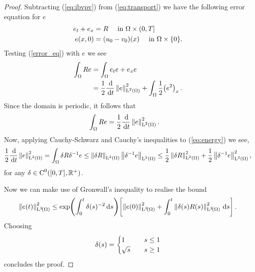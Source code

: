 \documentclass[final]{amsart}
\renewcommand{\d}{\ensuremath{\,\mathrm{d}}}
\numberwithin{equation}{section}
\begin{document}
\begin{proof}
  Subtracting (\ref{eq:ibvpv}) from (\ref{eq:transport}) we have the
  following error equation for $e$
  \begin{equation}\label{error_eq}
    \begin{aligned}
      e_t
      +
      e_x &=R \quad \text{ in }\Omega \times (0,T]
      \\
      e( x,0) &= (u_0 - v_0)( x) \quad \text{ in } \Omega \times \{0\}.
    \end{aligned}
  \end{equation}
  Testing (\ref{error_eq}) with $e$ we see
  \begin{equation}
    \begin{aligned}
      \int_\W Re &= \int_\W e_te+ e_x e
      \\
      &=
      \frac{1}{2}\dd t \Norm{e}_{\leb{2}(\W)}^2+\int_\W\frac{1}{2}  \qp{ e^2}_x.
    \end{aligned}
  \end{equation}
   Since the domain is periodic, it follows that
  \begin{equation}
    \label{eq:energy}
    \begin{aligned}    
      \int_\W Re
      &= 
      \frac{1}{2}\dd t \Norm{e}_{\leb{2}(\W)}^2.
    \end{aligned}
  \end{equation}
  Now, applying Cauchy-Schwarz and Cauchy's inequalities to
  (\ref{eq:energy}) we see,
  \begin{equation}
      \frac{1}{2}\dd t \Norm{e}_{\leb{2}(\W)}^2
      =
      \int_\W\delta R \delta^{-1} e
      \leq
      \Norm{\delta R}_{\leb{2}(\W)} \Norm{\delta^{-1} e}_{\leb{2}(\W)}
      \leq
      \frac{1}{2}\Norm{\delta R}_{\leb{2}(\W)}^2+ \frac{1}{2}\Norm{\delta^{-1} e}_{\leb{2}(\W)}^2,
  \end{equation}
  for any $\delta\in\operatorname C^{0}([0,T], \mathbb R^+)$.

  Now we can make use of Gronwall's inequality to realise the bound
  \begin{equation}
    \Norm{e\qp{t}}^2_{\leb{2}\qp{\W}}
    \leq
    \exp\qp{\int_{0}^{t}{\delta(s)^{-2}}\d s}
    \qb{\Norm{e\qp{0}}^2_{\leb{2}\qp{\W}}+\int_0^t\Norm{\delta(s) R(s)}^2_{\leb{2}\qp{\W}}  \d s }.
  \end{equation}
  Choosing 
  \begin{equation}
    \delta\!\left({s}\right)=
    \begin{cases}
      1 \quad &s\leq 1
      \\
      \sqrt{s}\quad &s\geq 1
    \end{cases}
  \end{equation}
  concludes the proof.
\end{proof}
\end{document}
